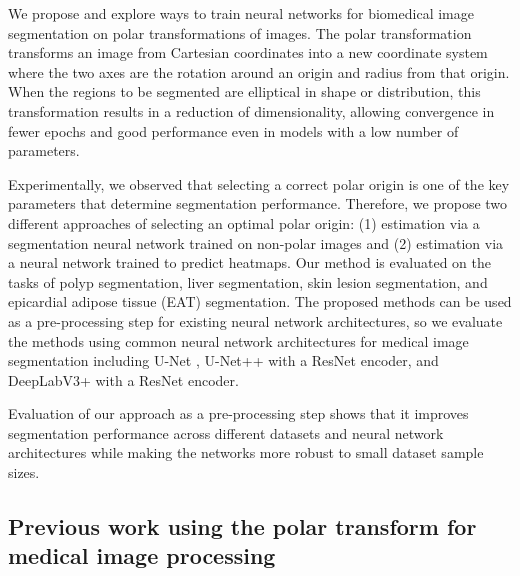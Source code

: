 We propose and explore ways to train neural networks for biomedical image segmentation on polar transformations of images. The polar transformation transforms an image from Cartesian coordinates into a new coordinate system where the two
axes are the rotation around an origin and radius from that origin. When the regions to be segmented are elliptical in shape or distribution, this transformation results in a reduction of dimensionality, allowing convergence in fewer epochs and good performance even in models with a low number of parameters. 

Experimentally, we observed that selecting
a correct polar origin is one of the key parameters that determine segmentation performance. Therefore, we propose two 
different approaches of selecting an optimal polar origin: (1)
estimation via a segmentation neural network trained on non-polar images and (2) estimation via a neural network trained
to predict heatmaps.
Our method is evaluated on 
the tasks of polyp segmentation, liver segmentation, skin 
lesion segmentation, and epicardial adipose tissue (EAT) segmentation.
The proposed methods can be used as a pre-processing step for 
existing neural network architectures, so we evaluate the methods using
common neural network architectures for medical image segmentation including U-Net 
\cite{ronnebergerUNetConvolutionalNetworks2015}, U-Net++ 
\cite{zhou2019unetplusplus} with a ResNet \cite{heDeepResidualLearning2016} encoder, and DeepLabV3+ \cite{chenEncoderDecoderAtrousSeparable2018} with a ResNet \cite{heDeepResidualLearning2016} encoder.

Evaluation of our approach as a pre-processing step shows that it improves segmentation performance across different datasets and neural network architectures while making the networks more robust to small dataset sample sizes.

    \subsection{Previous work using the polar transform for medical image processing}
    
